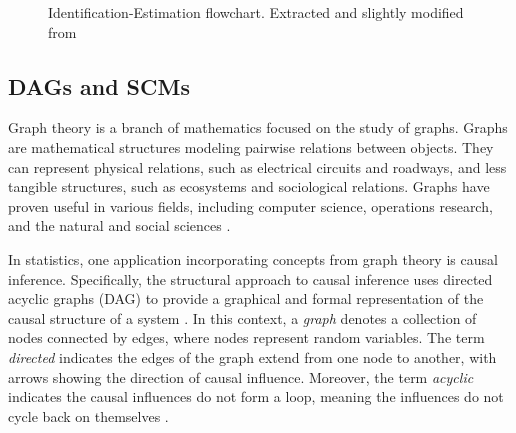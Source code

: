 \documentclass[
  authoryear,
  preprint,
  1p]{elsarticle}
\begin{document}
\begin{figure}


\caption{\label{fig-IEflow}Identification-Estimation flowchart.
Extracted and slightly modified from \citet[32]{Neal_2020}}

\end{figure}%

\subsection{DAGs and SCMs}\label{sec-framework-dag}

Graph theory is a branch of mathematics focused on the study of graphs.
Graphs are mathematical structures modeling pairwise relations between
objects. They can represent physical relations, such as electrical
circuits and roadways, and less tangible structures, such as ecosystems
and sociological relations. Graphs have proven useful in various fields,
including computer science, operations research, and the natural and
social sciences \citep{Gross_et_al_2018}.

In statistics, one application incorporating concepts from graph theory
is causal inference. Specifically, the structural approach to causal
inference uses directed acyclic graphs (DAG) to provide a graphical and
formal representation of the causal structure of a system
\citep{Neal_2020}. In this context, a \emph{graph} denotes a collection
of nodes connected by edges, where nodes represent random variables. The
term \emph{directed} indicates the edges of the graph extend from one
node to another, with arrows showing the direction of causal influence.
Moreover, the term \emph{acyclic} indicates the causal influences do not
form a loop, meaning the influences do not cycle back on themselves
\citep{McElreath_2020}.
\end{document}
